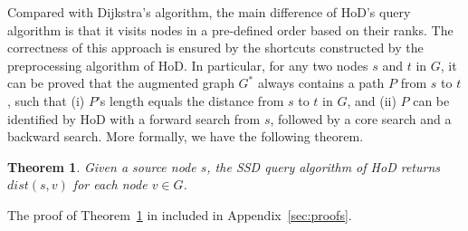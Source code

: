 \documentclass{sig-alternate}
\newtheorem{theorem} {Theorem}
\def\G{G^*}
\def\GC{G_c}
\def\d{dist}
\def\GB{G_b}
\begin{document}
\begin{sloppy}
Compared with Dijkstra's algorithm, the main difference of HoD's query algorithm is that it visits nodes in a pre-defined order based on their ranks. The correctness of this approach is ensured by the shortcuts constructed by the preprocessing algorithm of HoD. In particular, for any two nodes $s$ and $t$ in $G$, it can be proved that the augmented graph $\G$ always contains a path $P$ from $s$ to $t$, such that (i) $P$'s length equals the distance from $s$ to $t$ in $G$, and (ii) $P$ can be identified by HoD with a forward search from $s$, followed by a core search and a backward search. More formally, we have the following theorem.
\begin{theorem} \label{thrm:sssp-correct}
Given a source node $s$, the SSD query algorithm of HoD returns $\d(s, v)$ for each node $v \in G$.
\end{theorem}
The proof of Theorem~\ref{thrm:sssp-correct} in included in Appendix~\ref{sec:proofs}.
%
%


\end{sloppy}
\end{document}

